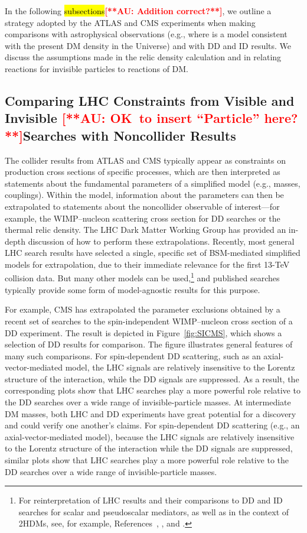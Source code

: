 \documentclass{ar-1col}
\newcommand{\IP}{invisible particle}
\begin{document}
In the following \hl{subsections}\textbf{\textcolor{red}{[**AU: Addition correct?**]}}, we outline a strategy adopted by the ATLAS and
CMS experiments when making comparisons with astrophysical
observations (e.g., where is a model consistent with the present
DM density in the Universe) and with DD and ID results. We discuss the
assumptions made in the relic density calculation and in relating
reactions for {\IP}s to reactions of DM.

\subsection{Comparing LHC Constraints from Visible and Invisible \textbf{\textcolor{red}{[**AU: OK\ to insert ``Particle'' here?**]}}Searches with Noncollider Results}

The collider results from ATLAS and CMS typically appear as constraints
on production cross sections of specific processes, which are then
interpreted as statements about the fundamental parameters of a
simplified model (e.g., masses, couplings). Within the model,
information about the parameters can then be extrapolated to
statements about the noncollider observable of interest---for
example, the WIMP--nucleon scattering cross section for DD searches or the
thermal relic density. The LHC Dark
Matter Working Group \cite{Boveia:2016mrp} has provided an in-depth discussion of how to
perform these extrapolations. Recently, most general LHC search
results have selected a single, specific set of BSM-mediated
simplified models for extrapolation, due to their immediate
relevance for the first 13-TeV collision data. But many other
models can be used,\footnote{For reinterpretation of LHC results
and their comparisons to DD and ID searches for scalar and pseudoscalar
mediators, as well as in the context of 2HDMs, see, for example, References~, , and .} and
published searches typically provide some form of model-agnostic
results for this purpose.

For example, CMS has extrapolated the parameter exclusions
obtained by a recent set of searches to the spin-independent
WIMP--nucleon cross section of a DD experiment. The
result is depicted in Figure~\ref{fig:SICMS}, which shows a selection of DD results
for comparison. The figure illustrates general features of
many such comparisons. For spin-dependent DD scattering, such as an axial-vector-mediated model, the LHC signals are relatively insensitive to the Lorentz structure of the interaction, while the DD signals are suppressed. As a result, the corresponding plots show that LHC searches play a more powerful role relative to the DD searches over a wide range of invisible-particle masses. At intermediate DM masses,
both LHC and DD experiments have great potential for a discovery
and could verify one another's claims. For spin-dependent DD
scattering (e.g., an axial-vector-mediated model), because the LHC
signals are relatively insensitive to the Lorentz structure of the
interaction while the DD signals are suppressed, similar plots
show that LHC searches play a more powerful role relative to the
DD searches over a wide range of invisible-particle masses.
\end{document}
